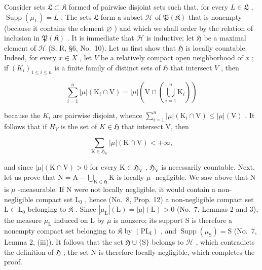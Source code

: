 Consider sets \(\mathfrak{L} \subset \mathfrak{K}\) formed of pairwise disjoint sets such that, for every \(L \in \mathfrak{L}\) , \(\operatorname{Supp}(\mu_L) = L\) . The sets \(\mathfrak{L}\) form a subset \(\mathscr{H}\) of \(\mathfrak{P}(\mathfrak{K})\) that is nonempty (because it contains the element \(\varnothing\) ) and which we shall order by the relation of inclusion in \(\mathfrak{P}(\mathfrak{K})\) . It is immediate that \(\mathscr{H}\) is inductive; let \(\mathfrak{H}\) be a maximal element of \(\mathscr{H}\) (S, R, §6, No.~10). Let us first show that \(\mathfrak{H}\) is locally countable. Indeed, for every \(x \in X\) , let \(V\) be a relatively compact open neighborhood of \(x\) ; if \((K_i)_{1 \leqslant i \leqslant n}\) is a finite family of distinct sets of \(\mathfrak{H}\) that intersect \(V\) , then

\[
\sum_ {i = 1} ^ {n} | \mu | \left(\mathrm{K} _ {i} \cap \mathrm{V}\right) = | \mu | \left(\mathrm{V} \cap \left(\bigcup_ {i = 1} ^ {n} \mathrm{K} _ {i}\right)\right)
\]

because the \(K_{i}\) are pairwise disjoint, whence \(\sum_{i=1}^{n}| \mu |(\mathrm{K}_{i} \cap \mathrm{V}) \leqslant |\mu |(\mathrm{V})\) . It follows that if \(H_{V}\) is the set of \(K \in \mathfrak{H}\) that intersect V, then

\[
\sum_ {\mathrm{K} \in \mathfrak {H} _ {\mathrm{V}}} | \mu | (\mathrm{K} \cap \mathrm{V}) <   + \infty ,
\]

and since \(|\mu|(\mathrm{K} \cap \mathrm{V}) > 0\) for every \(\mathrm{K} \in \mathfrak{H}_{\mathrm{V}}\) , \(\mathfrak{H}_{\mathrm{V}}\) is necessarily countable. Next, let us prove that \(\mathrm{N} = \mathrm{A} - \bigcup_{\mathrm{K} \in \mathfrak{H}} \mathrm{K}\) is locally \(\mu\) -negligible. We saw above that \(\mathrm{N}\) is \(\mu\) -measurable. If \(\mathrm{N}\) were not locally negligible, it would contain a non-negligible compact set \(\mathrm{L}_0\) , hence (No.~8, Prop. 12) a non-negligible compact set \(\mathrm{L} \subset \mathrm{L}_0\) belonging to \(\mathfrak{K}\) . Since \(|\mu_{\mathrm{L}}|(\mathrm{L}) = |\mu|(\mathrm{L}) > 0\) (No.~7, Lemmas 2 and 3), the measure \(\mu_{\mathrm{L}}\) induced on \(\mathrm{L}\) by \(\mu\) is nonzero; its support \(\mathrm{S}\) is therefore a nonempty compact set belonging to \(\mathfrak{K}\) by \((\mathrm{PL}_{\mathrm{I}})\) , and \(\operatorname{Supp}(\mu_{\mathrm{S}}) = \mathrm{S}\) (No.~7, Lemma 2, (iii)). It follows that the set \(\mathfrak{H} \cup \{\mathrm{S}\}\) belongs to \(\mathscr{H}\) , which contradicts the definition of \(\mathfrak{H}\) ; the set \(\mathrm{N}\) is therefore locally negligible, which completes the proof.

